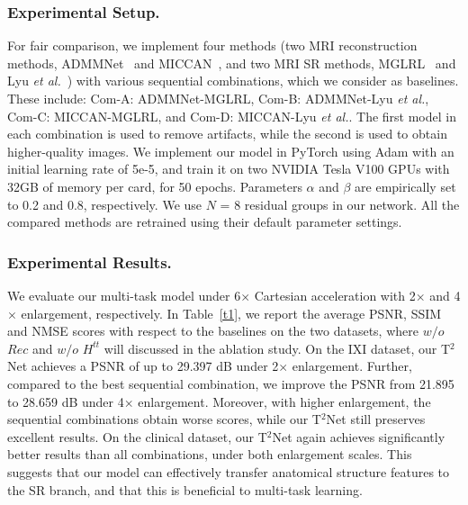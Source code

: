\documentclass[runningheads]{llncs}
\begin{document}
\subsubsection{Experimental Setup.}For fair comparison, we implement four methods (two MRI reconstruction methods, ADMMNet~\cite{yang2016deep} and MICCAN~\cite{huang2019mri}, and two MRI SR methods, MGLRL~\cite{shi2018super} and Lyu \textit{et al.}~\cite{lyu2020mri}) with various sequential combinations, which we consider as baselines. These include: Com-A: ADMMNet-MGLRL, Com-B: ADMMNet-Lyu \textit{et al.}, Com-C: MICCAN-MGLRL, and Com-D: MICCAN-Lyu \textit{et al.}. The first model in each combination is used to remove artifacts, while the second is used to obtain higher-quality images. We implement our model in PyTorch using Adam with an initial learning rate of 5e-5, and train it on two NVIDIA Tesla V100 GPUs with 32GB of memory per card, for 50 epochs. Parameters $\alpha$ and $\beta$ are empirically set to 0.2 and 0.8, respectively. We use $N$ = 8 residual groups in our network. All the compared methods are retrained using their default parameter settings. 

\subsubsection{Experimental Results.}

We evaluate our multi-task model under 6$\times$ Cartesian acceleration with 2$\times$ and 4$\times$ enlargement, respectively. In Table~\ref{t1}, we report the average PSNR, SSIM and NMSE scores with respect to the baselines on the two datasets, where $\textit{w/o}$ $Rec$ and $\textit{w/o}$ $H^{tt}$ will discussed in the ablation study. On the IXI dataset, our T$^2$Net achieves a PSNR of up to 29.397 dB under 2$\times$ enlargement. Further, compared to the best sequential combination, we improve the PSNR from 21.895 to 28.659 dB under 4$\times$ enlargement. Moreover, with higher enlargement, the sequential combinations obtain worse scores, while our T$^2$Net still preserves excellent results. 
On the clinical dataset, our T$^2$Net again achieves significantly better results than all combinations, under both enlargement scales. This suggests that our model can effectively transfer anatomical structure features to the SR branch, and that this is beneficial to multi-task learning.
\end{document}

